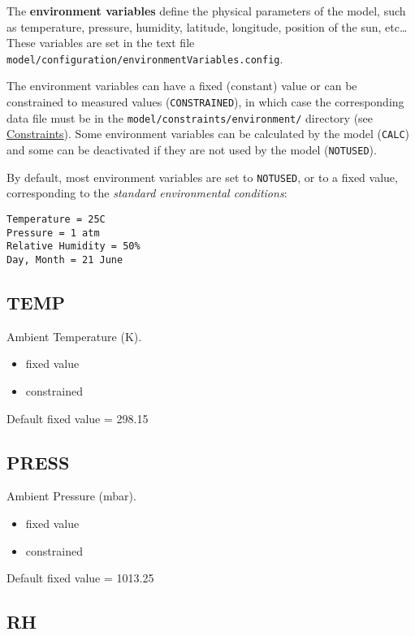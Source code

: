 The \textbf{environment variables} define the physical parameters of
the model, such as temperature, pressure, humidity, latitude,
longitude, position of the sun, etc\ldots{} These variables are set in
the text file\\
\texttt{model/configuration/environmentVariables.config}.

The environment variables can have a fixed (constant) value or can be
constrained to measured values (\texttt{CONSTRAINED}), in which case
the corresponding data file must be in the
\texttt{model/constraints/environment/} directory (see
\hyperref[sec:constraints]{Constraints}). Some environment variables
can be calculated by the model (\texttt{CALC}) and some can be
deactivated if they are not used by the model (\texttt{NOTUSED}).

By default, most environment variables are set to \texttt{NOTUSED}, or
to a fixed value, corresponding to the \emph{standard environmental
  conditions}:

\begin{verbatim}
Temperature = 25C
Pressure = 1 atm
Relative Humidity = 50%
Day, Month = 21 June
\end{verbatim}

\subsection{TEMP} \label{subsec:temp}

Ambient Temperature (K).

\begin{itemize}
\item fixed value
\item constrained
\end{itemize}

Default fixed value = 298.15

\subsection{PRESS} \label{subsec:press}

Ambient Pressure (mbar).

\begin{itemize}
\item fixed value
\item constrained
\end{itemize}

Default fixed value = 1013.25

\subsection{RH} \label{subsec:rh}

